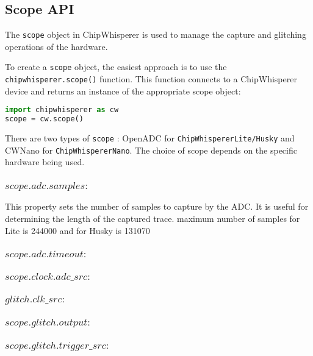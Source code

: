 \subsection{Scope API}
The \texttt{scope} object in ChipWhisperer is used to manage the capture and glitching operations of the hardware.

To create a \texttt{scope} object, the easiest approach is to use the \texttt{chipwhisperer.scope()} function. This function connects to a ChipWhisperer device and returns an instance of the appropriate scope object:

\begin{lstlisting}[language=Python]
import chipwhisperer as cw
scope = cw.scope()
\end{lstlisting}

There are two types of \texttt{scope} : OpenADC for \texttt{ChipWhispererLite/Husky} and CWNano for \texttt{ChipWhispererNano}. The choice of scope depends on the specific hardware being used.
\subsubsection{$scope.adc.samples :$} 
This property sets the number of samples to capture by the ADC. It is useful for determining the length of the captured trace.
maximum number of samples for Lite is 244000 and for Husky is 131070

\subsubsection{$scope.adc.timeout :$}   

\subsubsection{$scope.clock.adc\_src :$}

\subsubsection{$glitch.clk\_src :$}    

\subsubsection{$scope.glitch.output :$}

\subsubsection{$scope.glitch.trigger\_src :$}    

